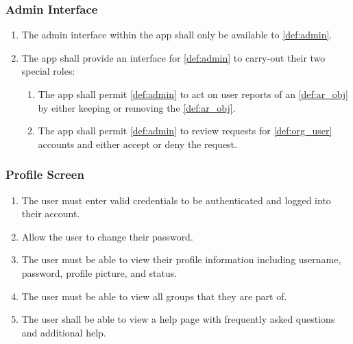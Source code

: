 \documentclass{article}
\begin{document}
\subsubsection{Admin Interface}
\label{ssub:admin_interface}

\begin{enumerate}[align=left, label=\textbf{AI-FR\arabic*:}]
    \item The admin interface within the app shall only be available to \ref{def:admin}.
    \item The app shall provide an interface for \ref{def:admin} to carry-out their two special roles:
    \begin{enumerate}[align=left, label=\textbf{AI-FR2.\arabic*:}]
        \item The app shall permit \ref{def:admin} to act on user reports of an \ref{def:ar_obj} by either keeping or removing the \ref{def:ar_obj}.
        \item The app shall permit \ref{def:admin} to review requests for \ref{def:org_user} accounts and either accept or deny the request.
    \end{enumerate}
\end{enumerate}

\subsubsection{Profile Screen}
\label{ssub:profile_screen}
\begin{enumerate}[align=left, label=\textbf{PS-FR\arabic*:}]
    \item The user must enter valid credentials to be authenticated and logged into their account.
    \item Allow the user to change their password.
    \item The user must be able to view their profile information including username, password, profile picture, and status.
    \item The user must be able to view all groups that they are part of.
    \item The user shall be able to view a help page with frequently asked questions and additional help.
\end{enumerate}
\end{document}

